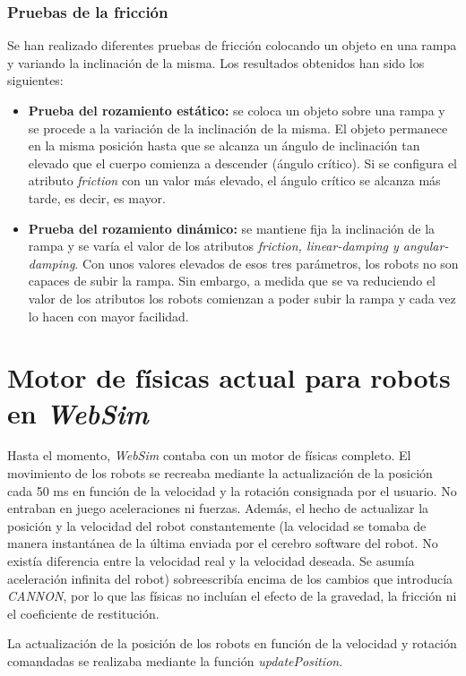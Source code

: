 \subsubsection{Pruebas de la fricción}
Se han realizado diferentes pruebas de fricción colocando un objeto en una rampa y variando la inclinación de la misma. Los resultados obtenidos han sido los siguientes:
\begin{itemize}
    \item \textbf{Prueba del rozamiento estático: } se coloca un objeto sobre una rampa y se procede a la variación de la inclinación de la misma. El objeto permanece en la misma posición hasta que se alcanza un ángulo de inclinación tan elevado que el cuerpo comienza a descender (ángulo crítico). Si se configura el atributo \textit{friction} con un valor más elevado, el ángulo crítico se alcanza más tarde, es decir, es mayor.
    \item \textbf{Prueba del rozamiento dinámico: } se mantiene fija la inclinación de la rampa y se varía el valor de los atributos \textit{friction, linear-damping y angular-damping}. Con unos valores elevados de esos tres parámetros, los robots no son capaces de subir la rampa. Sin embargo, a medida que se va reduciendo el valor de los atributos los robots comienzan a poder subir la rampa y cada vez lo hacen con mayor facilidad.
\end{itemize}

\section{Motor de físicas actual para robots en \textit{WebSim}}
Hasta el momento, \textit{WebSim} contaba con un motor de físicas completo. El movimiento de los robots se recreaba mediante la actualización de la posición cada 50 ms en función de la velocidad y la rotación consignada por el usuario. No entraban en juego aceleraciones ni fuerzas. Además, el hecho de actualizar la posición y la velocidad del robot constantemente (la velocidad se tomaba de manera instantánea de la última enviada por el cerebro software del robot. No existía diferencia entre la velocidad real y la velocidad deseada. Se asumía aceleración infinita del robot) sobreescribía encima de los cambios que introducía \textit{CANNON}, por lo que las físicas no incluían el efecto de la gravedad, la fricción ni el coeficiente de restitución. \newline 

La actualización de la posición de los robots en función de la velocidad y rotación comandadas se realizaba mediante la función \textit{updatePosition}.

